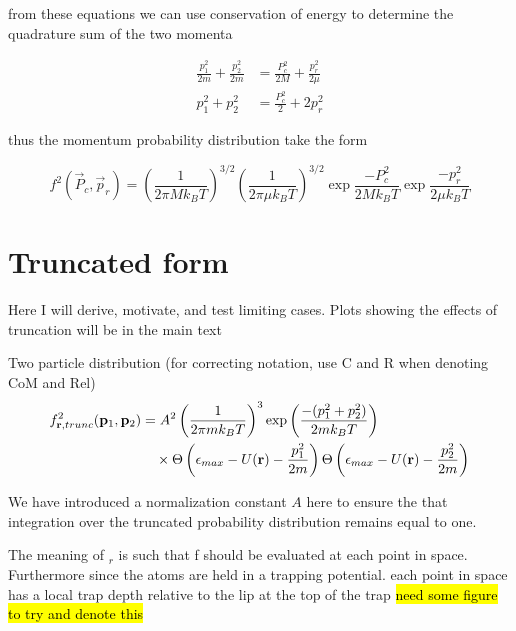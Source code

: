 from these equations we can use conservation of energy to determine the quadrature sum of the two momenta

\begin{align*}
	\frac{p_1^2}{2m} + \frac{p_2^2}{2m} &= \frac{P_c^2}{2M} + \frac{p_r^2}{2\mu} \\
	p_1^2 + p_2^2 &= \frac{P_c^2}{2} + 2 p_r^2
\end{align*}

thus the momentum probability distribution take the form

\begin{equation}
\label{eq:two_particle_prob_inf_atomFrame}
		 f^2( \vec{P}_c, \vec{p}_r ) = \left(\frac{1}{2 \pi M k_B T}\right)^{3/2} \left(\frac{1}{2 \pi \mu k_B T}\right)^{3/2} 
		 \exp{\frac{-P_c^2}{2 M k_B T}} \exp{\frac{-p_r^2}{2 \mu k_B T}}
\end{equation}

\section{Truncated form}
\label{sec:truncDist}

Here I will derive, motivate, and test limiting cases. Plots showing the effects of truncation will be in the main text

Two particle distribution (for correcting notation, use C and R when denoting CoM and Rel)
\begin{equation}
\begin{split}
	f^2_{\mathbf{r},trunc} (\mathbf{p}_1, \mathbf{p}_2) &= A^2 \left(\frac{1}{2 \pi m k_B T}\right)^3 \text{exp}\left( { \frac{-(p_1^2 + p_2^2)}{2 m k_B T}} \right) \\ &\quad \times \Theta \left( {\epsilon_{max} - U(\mathbf{r}) - \frac{p_1^2}{2m}} \right) \Theta \left( {\epsilon_{max} - U(\mathbf{r}) - \frac{p_2^2}{2m}} \right)
\end{split}
\end{equation}

We have introduced a normalization constant $A$ here to ensure the that integration over the truncated probability distribution remains equal to one.

The meaning of $_r$ is such that f should be evaluated at each point in space. Furthermore since the atoms are held in a trapping potential. each point in space has a local trap depth relative to the lip at the top of the trap \hl{need some figure to try and denote this}

